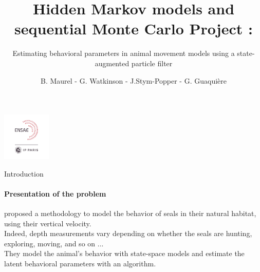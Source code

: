 \documentclass[dvipsnames, handout]{beamer}
\begin{document}

\title{\color{titleText} Hidden Markov models and sequential Monte Carlo Project :}
\subtitle{\color{Blue} Estimating behavioral parameters in animal
movement models using a state-augmented
particle filter}
\author{B. Maurel - G. Watkinson - J.Stym-Popper - G. Guaquière \vspace{-.3cm}}
\date{}

\begin{frame}
\titlepage
\vspace{-1.2cm}
\begin{center}
\includegraphics[width=2.3cm]{logo-ensae.png}\bigskip
\end{center}
\end{frame}


\begin{frame}{Introduction}
\framesubtitle{Presentation of the problem}

\citet{dowd2011estimating} proposed a methodology to model the behavior of seals in their natural habitat, using their vertical velocity.
\newline
\\
Indeed, depth measurements vary depending on whether the seals are hunting, exploring, moving, and so on ...
\newline
\\
They model the animal's behavior with state-space models and estimate the latent behavioral parameters with an algorithm.




\end{frame}
\end{document}
